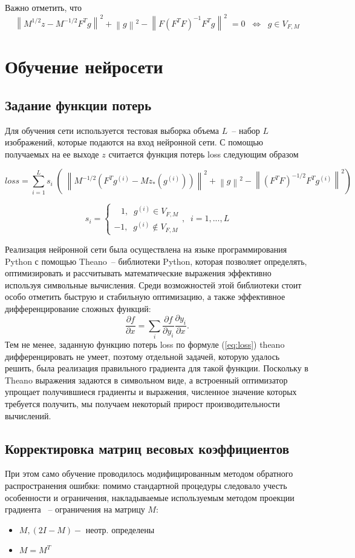 \documentclass[a4paper, 12pt]{article}
\newcommand{\norm}[1]{\left\|#1\right\|}
\begin{document}
Важно отметить, что
$$\norm{M^{1/2} z - M^{-1/2} F^T g}^2 + \norm{g}^2 - \norm{F (F^T F)^{-1} F^T g}^2 \; = 0 \;\;\Leftrightarrow \;\; g \in V_{F, M}$$


\section{Обучение нейросети}
\subsection{Задание функции потерь}

Для обучения сети используется тестовая выборка объема $L$~-- набор $L$ изображений, которые подаются на вход нейронной сети. С помощью получаемых на ее выходе $z$ считается функция потерь loss следующим образом

\begin{equation}\label{eq:loss}
loss = \sum\limits_{i=1}^L s_i\; \left(\;\norm{ M^{-1/2} (F^T g^{(i)} - M z_*(g^{(i)})) }^2 + \norm{g}^2 - \norm{(F^T F)^{-1/2} F^T g^{(i)}}^2\right)
\end{equation}


\hspace{1.5cm}
$$
	s_i = 
	\begin{cases}
		\;\;\;1, \;\; g^{(i)} \in V_{F, M}\\
		-1, \;\; g^{(i)} \notin V_{F, M}
	\end{cases}, \;\;i = 1, ..., L
$$

Реализация нейронной сети была осуществлена на языке программирования Python с помощью Theano~-- библиотеки Python, которая позволяет определять, оптимизировать и рассчитывать математические выражения эффективно используя символьные вычисления. Среди возможностей этой библиотеки стоит особо отметить быструю и стабильную оптимизацию, а также эффективное дифференцирование сложных функций:
$$\frac{\partial f}{\partial x} = \sum\limits_i \frac{\partial f}{\partial y_i} \frac{\partial y_i}{\partial x}.$$ Тем не менее, заданную функцию потерь loss по формуле (\ref{eq:loss}) theano дифференцировать не умеет, поэтому отдельной задачей, которую удалось решить, была реализация правильного градиента для такой функции. Поскольку в Theano выражения задаются в символьном виде, а встроенный оптимизатор упрощает получившиеся градиенты и выражения, численное значение которых требуется получить, мы получаем некоторый прирост производительности вычислений. 

\subsection{Корректировка матриц весовых коэффициентов}
При этом само обучение проводилось модифицированным методом обратного распространения ошибки: помимо стандартной процедуры следовало учесть особенности и ограничения, накладываемые используемым методом проекции градиента ~-- ограничения на матрицу $M$:
\begin{itemize}
\item $M, (2 I - M) - $ неотр. определены
\item $M = M^T$
\end{itemize}
\end{document}
